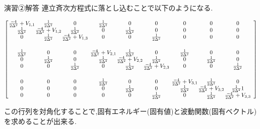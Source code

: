 \documentclass{beamer}
\begin{document}
\begin{frame}{演習②\quad 解答}
    連立斉次方程式に落とし込むことで以下のようになる.
\begin{flushleft}    
    {\tiny
    \[
    \left[
    \begin{array}{@{\hskip 1pt}c@{\hskip 1pt}c@{\hskip 1pt}c@{\hskip 3pt}
                  @{\hskip 1pt}c@{\hskip 1pt}c@{\hskip 1pt}c@{\hskip 3pt}
                  @{\hskip 1pt}c@{\hskip 1pt}c@{\hskip 1pt}c}
    \frac{-4}{2\Delta^2}+V_{1,1} &  \frac{1}{2\Delta^2} & 0 &  \frac{1}{2\Delta^2} & 0 & 0 & 0 & 0 & 0 \\
    \frac{1}{2\Delta^2} & \frac{-4}{2\Delta^2}+V_{1,2} &  \frac{1}{2\Delta^2} & 0 &  \frac{1}{2\Delta^2} & 0 & 0 & 0 & 0 \\
    0 &  \frac{1}{2\Delta^2} & \frac{-4}{2\Delta^2}+V_{1,3} & 0 & 0 &  \frac{1}{2\Delta^2} & 0 & 0 & 0 \\
    \rule{0pt}{1.2em} \\  %
    \frac{1}{2\Delta^2} & 0 & 0 & \frac{-4}{2\Delta^2}+V_{2,1} &  \frac{1}{2\Delta^2} & 0 &  \frac{1}{2\Delta^2} & 0 & 0 \\
    0 &  \frac{1}{2\Delta^2} & 0 &  \frac{1}{2\Delta^2} & \frac{-4}{2\Delta^2}+V_{2,2} &  \frac{1}{2\Delta^2} & 0 &  \frac{1}{2\Delta^2} & 0 \\
    0 & 0 &  \frac{1}{2\Delta^2} & 0 &  \frac{1}{2\Delta^2} & \frac{-4}{2\Delta^2}+V_{2,3} & 0 & 0 &  \frac{1}{2\Delta^2} \\
    \rule{0pt}{1.2em} \\
    0 & 0 & 0 &  \frac{1}{2\Delta^2} & 0 & 0 & \frac{-4}{2\Delta^2}+V_{3,1} &  \frac{1}{2\Delta^2} & 0 \\
    0 & 0 & 0 & 0 &  \frac{1}{2\Delta^2} & 0 &  \frac{1}{2\Delta^2} & \frac{-4}{2\Delta^2}+V_{3,2} &  \frac{1}{2\Delta^2}1 \\
    0 & 0 & 0 & 0 & 0 &  \frac{1}{2\Delta^2} & 0 &  \frac{1}{2\Delta^2} & \frac{-4}{2\Delta^2}+V_{3,3}
    \end{array}
    \right]
    \]
    \normalsize}
\end{flushleft}
    この行列を対角化することで,固有エネルギー(固有値)と波動関数(固有ベクトル)を求めることが出来る.
    

\end{frame}
    
\end{document}

